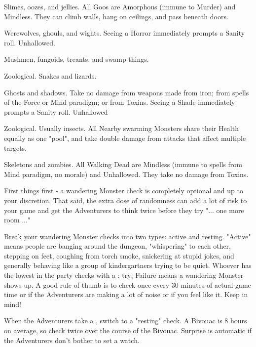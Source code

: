 {\begin{multicols}{2}
{    \item {}  Slimes, oozes, and jellies. All Goos are Amorphous (immune to Murder) and Mindless. They can climb walls, hang on ceilings, and pass beneath doors.
    \item {}  Werewolves, ghouls, and wights.  Seeing a Horror immediately prompts a Sanity roll. Unhallowed.
    \item {}  Mushmen, fungoids, treants, and swamp things.
    \item {}  Zoological.  Snakes and lizards.
    \item {}  Ghosts and shadows. Take no damage from weapons made from iron; from spells of the Force or Mind paradigm; or from Toxins. Seeing a Shade immediately prompts a Sanity roll.  Unhallowed
    \item {}  Zoological.  Usually insects.  All Nearby swarming Monsters share their Health equally as one "pool", and take double damage from attacks that affect multiple targets.
    \item {}  Skeletons and zombies. All Walking Dead are Mindless (immune to spells from Mind paradigm, no morale) and Unhallowed. They take no damage from Toxins.
}


\newpage


First things first - a wandering Monster check is completely optional and up to your discretion.  That said, the extra dose of randomness can add a lot of risk to your game and get the Adventurers to think twice before they try "... one more room ..."

Break your wandering Monster checks into two types: active and resting.  "Active" means people are banging around the dungeon, "whispering" to each other, stepping on feet, coughing from torch smoke, snickering at stupid jokes, and generally behaving like a group of kindergartners trying to be quiet.  Whoever has the lowest \MD in the party checks with a \RS : \MD try; Failure means a wandering Monster shows up.  A good rule of thumb is to check once every 30 minutes of actual game time or if the Adventurers are making a lot of noise or if you feel like it.  Keep  in mind!

When the Adventurers take a , switch to a "resting" check.  A Bivouac is 8 hours on average, so check twice over the course of the Bivouac.  Surprise is automatic if the Adventurers don't bother to set a watch.


\end{multicols}}
